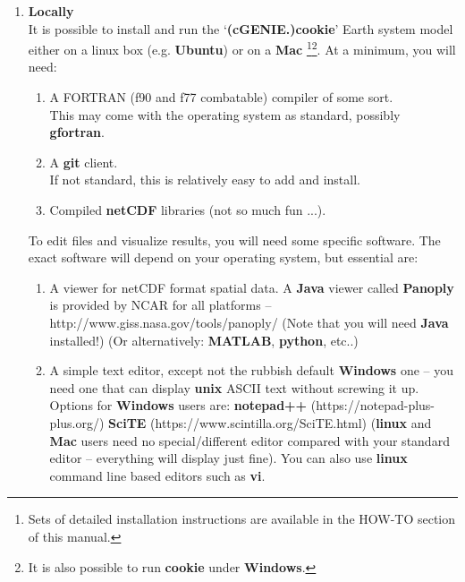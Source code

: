 \begin{enumerate}[noitemsep]
\vspace{1mm}
\item \textbf{Locally}
\\It is  possible to install and run the ‘\textbf{(cGENIE.)cookie}’ Earth system model either on a linux box (e.g. \textbf{Ubuntu}) or on a \textbf{Mac} \footnote{Sets of detailed installation instructions are available in the HOW-TO section of this manual.}\footnote{It is also possible to run \textbf{cookie} under \textbf{Windows}.}. At a minimum, you will need:
\vspace{1mm}
\begin{enumerate}[noitemsep]
\setlength{\itemindent}{.2in}
\item A FORTRAN (f90 and f77 combatable) compiler of some sort.
\\This may come with the operating system as standard, possibly \textbf{gfortran}.
\item A \textbf{git} client.
\\If not standard, this is relatively easy to add and install.
\item Compiled \textbf{netCDF} libraries (not so much fun ...).
\end{enumerate}
\vspace{1mm}
To edit files and visualize results, you will need some specific software. The exact software will depend on your operating system, but essential are:
\vspace{1mm}
\begin{enumerate}[noitemsep]
\setlength{\itemindent}{.2in}
\item A viewer for netCDF format spatial data. A \textbf{Java} viewer called \textbf{Panoply} is provided by NCAR for all platforms – http://www.giss.nasa.gov/tools/panoply/
(Note that you will need \textbf{Java} installed!) (Or alternatively: \textbf{MATLAB}, \textbf{python}, etc..)
\item  A simple text editor, except not the rubbish default \textbf{Windows} one – you need one that can display \textbf{unix} ASCII text without screwing it up. Options for \textbf{Windows} users are:
\textbf{notepad++} (https://notepad-plus-plus.org/)
\textbf{SciTE} (https://www.scintilla.org/SciTE.html)
(\textbf{linux} and \textbf{Mac} users need no special/different editor compared with your standard editor – everything will display just fine). You can also use \textbf{linux} command line based editors such as \textbf{vi}.
\end{enumerate}
\vspace{1mm}

\end{enumerate}
\vspace{1mm}


